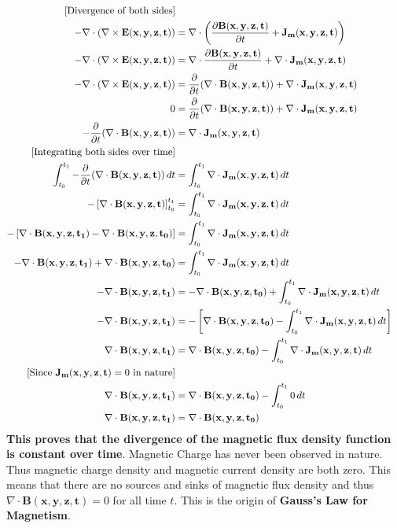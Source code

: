 \begin{align*}
  \text{[Divergence of both sides]} \\
  -\nabla \cdot (\nabla \times \mathbf{E(x,y,z,t)}) &= \nabla \cdot \left(\frac{\partial \mathbf{B(x,y,z,t)}}{\partial t} + \mathbf{J_m(x,y,z,t)}\right) \\
  -\nabla \cdot (\nabla \times \mathbf{E(x,y,z,t)}) &= \nabla \cdot \frac{\partial \mathbf{B(x,y,z,t)}}{\partial t} + \nabla \cdot \mathbf{J_m(x,y,z,t)} \\
  -\nabla \cdot (\nabla \times \mathbf{E(x,y,z,t)}) &= \frac{\partial}{\partial t} (\nabla \cdot \mathbf{B(x,y,z,t)}) + \nabla \cdot \mathbf{J_m(x,y,z,t)} \\
  0 &= \frac{\partial}{\partial t} (\nabla \cdot \mathbf{B(x,y,z,t)}) + \nabla \cdot \mathbf{J_m(x,y,z,t)} \\
  - \frac{\partial}{\partial t} (\nabla \cdot \mathbf{B(x,y,z,t)}) &= \nabla \cdot \mathbf{J_m(x,y,z,t)} \\
  \text{[Integrating both sides over time]} \\
  \int_{t_0}^{t_1} - \frac{\partial}{\partial t} (\nabla \cdot \mathbf{B(x,y,z,t)}) \, dt &= \int_{t_0}^{t_1} \nabla \cdot \mathbf{J_m(x,y,z,t)} \, dt \\
  - \left[\nabla \cdot \mathbf{B(x,y,z,t)}\right]_{t_0}^{t_1} &= \int_{t_0}^{t_1} \nabla \cdot \mathbf{J_m(x,y,z,t)} \, dt \\
  - \left[\nabla \cdot \mathbf{B(x,y,z,t_1)} - \nabla \cdot \mathbf{B(x,y,z,t_0)}\right] &= \int_{t_0}^{t_1} \nabla \cdot \mathbf{J_m(x,y,z,t)} \, dt \\
  - \nabla \cdot \mathbf{B(x,y,z,t_1)} + \nabla \cdot \mathbf{B(x,y,z,t_0)} &=  \int_{t_0}^{t_1} \nabla \cdot \mathbf{J_m(x,y,z,t)} \, dt \\
  - \nabla \cdot \mathbf{B(x,y,z,t_1)} &= - \nabla \cdot \mathbf{B(x,y,z,t_0)} + \int_{t_0}^{t_1} \nabla \cdot \mathbf{J_m(x,y,z,t)} \, dt \\
  - \nabla \cdot \mathbf{B(x,y,z,t_1)} &= - \left[\nabla \cdot \mathbf{B(x,y,z,t_0)} - \int_{t_0}^{t_1} \nabla \cdot \mathbf{J_m(x,y,z,t)} \, dt\right] \\
  \nabla \cdot \mathbf{B(x,y,z,t_1)} &= \nabla \cdot \mathbf{B(x,y,z,t_0)} - \int_{t_0}^{t_1} \nabla \cdot \mathbf{J_m(x,y,z,t)} \, dt \\
  \text{[Since \( \mathbf{J_m(x,y,z,t)} = 0 \) in nature]} \\
  \nabla \cdot \mathbf{B(x,y,z,t_1)} &= \nabla \cdot \mathbf{B(x,y,z,t_0)} - \int_{t_0}^{t_1} 0 \, dt \\
  \nabla \cdot \mathbf{B(x,y,z,t_1)} &= \nabla \cdot \mathbf{B(x,y,z,t_0)}
\end{align*}
\textbf{This proves that the divergence of the magnetic flux density function
is constant over time}. Magnetic Charge has never been observed in nature.
Thus magnetic charge density and magnetic current density are both zero. This
means that there are no sources and sinks of magnetic flux density and thus
\( \nabla \cdot \mathbf{B(x,y,z,t)} = 0 \) for all time \(t\). This is
the origin of \textbf{Gauss's Law for Magnetism}.

